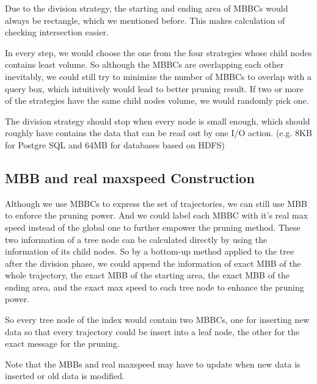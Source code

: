 \documentclass[sigplan]{acmart}
\begin{document}
Due to the division strategy, the starting and ending area of MBBCs would always be rectangle, which we mentioned before. This makes calculation of checking intersection easier.

In every step, we would choose the one from the four strategies whose child nodes contains least volume. So although the MBBCs are overlapping each other inevitably, we could still try to minimize the number of MBBCs to overlap with a query box, which intuitively would lead to better pruning result. If two or more of the strategies have the same child nodes volume, we would randomly pick one.\par

The division strategy should stop when every node is small enough, which should roughly have contains the data that can be read out by one I/O action. (e.g. 8KB for Postgre SQL and 64MB for databases based on HDFS)

\subsection{MBB and real maxspeed Construction}
Although we use MBBCs to express the set of trajectories, we can still use MBB to enforce the pruning power. And we could label each MBBC with it's real max speed instead of the global one to further empower the pruning method. These two information of a tree node can be calculated directly by using the information of its child nodes. So by a bottom-up method applied to the tree after the division phase, we could append the information of exact MBB of the whole trajectory, the exact MBB of the starting area, the exact MBB of the ending area, and the exact max speed to each tree node to enhance the pruning power. \par
So every tree node of the index would contain two MBBCs, one for inserting new data so that every trajectory could be insert into a leaf node, the other for the exact message for the pruning.\par
Note that the MBBs and real maxspeed may have to update when new data is inserted or old data is modified.\par
\end{document}
